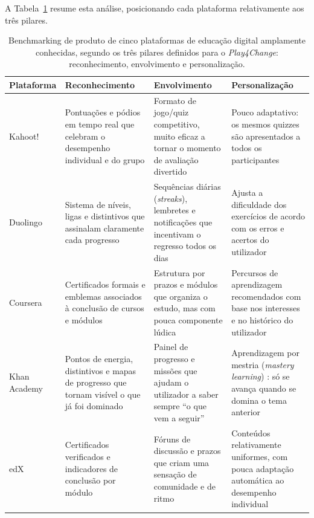 A Tabela~\ref{tab:comparacao-plataformas} resume esta análise, posicionando cada plataforma relativamente aos três pilares.

\begin{table}[h]
	\centering
	\small
	\begin{tabular}{p{2.0cm} p{3.55cm} p{3.55cm} p{4.1cm}}
		\toprule
		\textbf{Plataforma} & \textbf{Reconhecimento} & \textbf{Envolvimento} & \textbf{Personalização} \\
		\midrule
		Kahoot! &
			Pontuações e pódios em tempo real que celebram o desempenho individual e do grupo &
			Formato de jogo/quiz competitivo, muito eficaz a tornar o momento de avaliação divertido &
			Pouco adaptativo: os mesmos quizzes são apresentados a todos os participantes \\
		\addlinespace
		Duolingo &
			Sistema de níveis, ligas e distintivos que assinalam claramente cada progresso &
			Sequências diárias (\emph{streaks}), lembretes e notificações que incentivam o regresso todos os dias &
			Ajusta a dificuldade dos exercícios de acordo com os erros e acertos do utilizador \\
		\addlinespace
		Coursera &
			Certificados formais e emblemas associados à conclusão de cursos e módulos &
			Estrutura por prazos e módulos que organiza o estudo, mas com pouca componente lúdica &
			Percursos de aprendizagem recomendados com base nos interesses e no histórico do utilizador \\
		\addlinespace
		Khan Academy &
			Pontos de energia, distintivos e mapas de progresso que tornam visível o que já foi dominado &
			Painel de progresso e missões que ajudam o utilizador a saber sempre ``o que vem a seguir'' &
			Aprendizagem por mestria (\emph{mastery learn\-ing}) \cite{bloom1968learning}: só se avança quando se domina o tema anterior \\
		\addlinespace
		edX &
			Certificados verificados e indicadores de conclusão por módulo &
			Fóruns de discussão e prazos que criam uma sensação de comunidade e de ritmo &
			Conteúdos relativamente uniformes, com pouca adaptação automática ao desempenho individual \\
		\bottomrule
	\end{tabular}
	\caption[Análise comparativa de plataformas de educação digital segundo os três pilares do Play4Change]{Benchmarking de produto de cinco plataformas de educação digital amplamente conhecidas, segundo os três pilares definidos para o \emph{Play4Change}: reconhecimento, envolvimento e personalização.}
	\label{tab:comparacao-plataformas}
\end{table}

